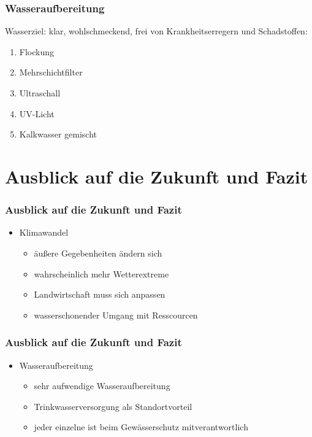 \documentclass{beamer}
\begin{document}
	\begin{frame}
		\frametitle{Wasseraufbereitung}
		\LARGE
		Wasserziel: klar, wohlschmeckend, frei von Krankheitserregern und Schadstoffen:
		\begin{enumerate}
			\item Flockung
			\item Mehrschichtfilter
			\item Ultraschall
			\item UV-Licht
			\item Kalkwasser gemischt
		\end{enumerate}
	\end{frame}
	
	
	\section{Ausblick auf die Zukunft und Fazit}
	\begin{frame}
		\frametitle{Ausblick auf die Zukunft und Fazit}
		\LARGE
		
		\begin{itemize}
			\item Klimawandel
			
			\begin{itemize}
				\LARGE
				\item äußere Gegebenheiten ändern sich
				
				\item wahrscheinlich mehr Wetterextreme
				
				\item Landwirtschaft muss sich anpassen
				
				\item wasserschonender Umgang mit Resscourcen
			\end{itemize}
		\end{itemize}
	\end{frame}
	
	\begin{frame}
		\frametitle{Ausblick auf die Zukunft und Fazit}
		\LARGE
		
		\begin{itemize}
			\item Wasseraufbereitung
			
			\begin{itemize}
				\LARGE
				\item sehr aufwendige Wasseraufbereitung
				
				\item Trinkwasserversorgung als Standortvorteil
				
				\item jeder einzelne ist beim Gewässerschutz mitverantwortlich
			\end{itemize}
		\end{itemize}
	\end{frame}
	
\end{document}
